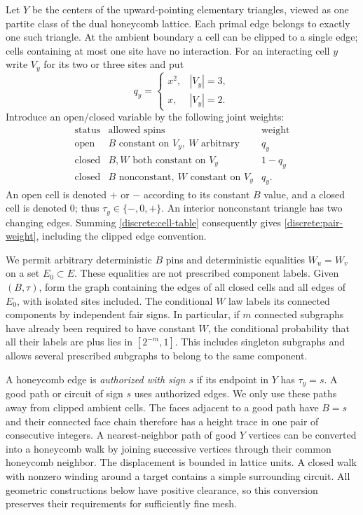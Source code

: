 Let $Y$ be the centers of the upward-pointing elementary triangles, viewed
as one partite class of the dual honeycomb lattice. Each primal edge belongs
to exactly one such triangle. At the ambient boundary a cell can be clipped
to a single edge; cells containing at most one site have no interaction.
For an interacting cell $y$ write $V_y$ for its two or three sites and put
\[
 q_y=\begin{cases}x^2,&|V_y|=3,\\ x,&|V_y|=2.\end{cases}
\]
Introduce an open/closed variable by the following joint weights:
\begin{equation}\label{discrete:cell-table}
\begin{array}{c|c|c}
 \text{status}&\text{allowed spins}&\text{weight}\\ \hline
 \text{open}&B\text{ constant on }V_y,\ W\text{ arbitrary}&q_y\\
 \text{closed}&B,W\text{ both constant on }V_y&1-q_y\\
 \text{closed}&B\text{ nonconstant},\ W\text{ constant on }V_y&q_y.
\end{array}
\end{equation}
An open cell is denoted $+$ or $-$ according to its constant $B$ value,
and a closed cell is denoted $0$; thus $\tau_y\in\{-,0,+\}$.
An interior nonconstant triangle has two changing edges. Summing
\eqref{discrete:cell-table} consequently gives
\eqref{discrete:pair-weight}, including the clipped edge convention.

We permit arbitrary deterministic $B$ pins and deterministic equalities
$W_u=W_v$ on a set $E_0\subset E$. These equalities are not prescribed
component labels. Given $(B,\tau)$, form the graph containing the edges of
all closed cells and all edges of $E_0$, with isolated sites included.
The conditional $W$ law labels its connected components by independent
fair signs. In particular, if $m$ connected subgraphs have already been
required to have constant $W$, the conditional probability that all their
labels are plus lies in $[2^{-m},1]$. This includes singleton subgraphs and
allows several prescribed subgraphs to belong to the same component.

A honeycomb edge is \emph{authorized with sign $s$} if its endpoint in $Y$
has $\tau_y=s$. A good path or circuit of sign $s$ uses authorized edges.
We only use these paths away from clipped ambient cells. The faces adjacent
to a good path have $B=s$ and their connected face chain therefore has a
height trace in one pair of consecutive integers. A nearest-neighbor path
of good $Y$ vertices can be converted into a honeycomb walk by joining
successive vertices through their common honeycomb neighbor. The
displacement is bounded in lattice units. A closed walk with nonzero winding
around a target contains a simple surrounding circuit. All geometric
constructions below have positive clearance, so this conversion preserves
their requirements for sufficiently fine mesh.

